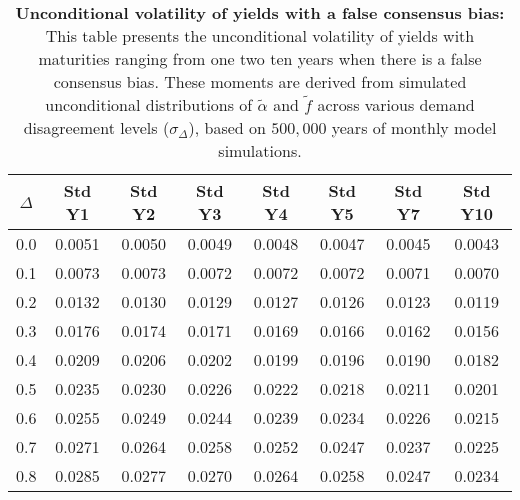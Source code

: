 \begin{table}[h!]
\centering
\caption{\textbf{Unconditional volatility of yields with a false consensus bias:} This table presents the unconditional volatility of yields with maturities ranging from one two ten years when there is a false consensus bias. These moments are derived from simulated unconditional distributions of $\tilde{\alpha}$ and $\tilde{f}$ across various demand disagreement levels ($\sigma_{\Delta}$), based on $500,000$ years of monthly model simulations.}
\begin{tabular}{c|ccccccc}
\hline
$\Delta$ & Std Y1 & Std Y2 & Std Y3 & Std Y4 & Std Y5 & Std Y7 & Std Y10 \\
\hline
0.0 & 0.0051 & 0.0050 & 0.0049 & 0.0048 & 0.0047 & 0.0045 & 0.0043 \\
0.1 & 0.0073 & 0.0073 & 0.0072 & 0.0072 & 0.0072 & 0.0071 & 0.0070 \\
0.2 & 0.0132 & 0.0130 & 0.0129 & 0.0127 & 0.0126 & 0.0123 & 0.0119 \\
0.3 & 0.0176 & 0.0174 & 0.0171 & 0.0169 & 0.0166 & 0.0162 & 0.0156 \\
0.4 & 0.0209 & 0.0206 & 0.0202 & 0.0199 & 0.0196 & 0.0190 & 0.0182 \\
0.5 & 0.0235 & 0.0230 & 0.0226 & 0.0222 & 0.0218 & 0.0211 & 0.0201 \\
0.6 & 0.0255 & 0.0249 & 0.0244 & 0.0239 & 0.0234 & 0.0226 & 0.0215 \\
0.7 & 0.0271 & 0.0264 & 0.0258 & 0.0252 & 0.0247 & 0.0237 & 0.0225 \\
0.8 & 0.0285 & 0.0277 & 0.0270 & 0.0264 & 0.0258 & 0.0247 & 0.0234 \\
\hline
\end{tabular}
\end{table}

